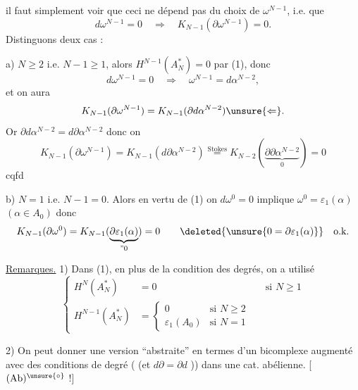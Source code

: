 
il faut simplement voir que ceci ne dépend pas du choix de $\omega^{N-1}$, i.e. que 
\[
d\omega^{N-1}=0\quad\Longrightarrow\quad
K_{N-1}(\partial\omega^{N-1})=0.
\]
Distinguons deux cas :

a) $N\geq2$ i.e. $N-1\geq1$, alors $H^{N-1}(A_N^*)=0$ par (1), donc
\[
d\omega^{N-1}=0\quad\Rightarrow\quad
\omega^{N-1}=d\alpha^{N-2},
\]
et on aura
\[
K_{N-1}(\partial\omega^{N-1})
=K_{N-1}(\partial d\alpha^{N-2})\unsure{\Leftarrow}.
\]
Or  $\partial d\alpha^{N-2}=d\partial\alpha^{N-2}$ donc on 
\[
K_{N-1}(\partial\omega^{N-1})
=K_{N-1}(d\partial\alpha^{N-2})
\overset{\text{Stokes}}{=}
K_{N-2}(\underbrace{\partial\partial\alpha^{N-2}}_{0})=0
\]
cqfd

b) $N=1$ i.e. $N-1=0$. Alors en vertu de (1) on
$d\omega^0=0$ implique $\omega^0=\varepsilon_1(\alpha)$
$(\alpha\in A_0)$ donc
\[
K_{N-1}(\partial\omega^0)
=K_{N-1}(\underbrace{\partial\varepsilon_1(\alpha)}_{\text{''}0})=0
\qquad\deleted{\unsure{0=\partial\varepsilon_1(\alpha)}}\quad\text{o.k.}
\]

\uline{Remarques.} 1) Dans  (1), en plus de la condition des degrés, on a utilisé
\[
\left\{
\begin{aligned}
H^N(A_N^*)&=0 &&\text{si }N\geq1\\
H^{N-1}(A_N^*)&=
\begin{cases}
0&\text{si }N\geq2\\
\varepsilon_1(A_0)&\text{si }N=1
\end{cases}
\end{aligned}
\right.
\]

2) On peut donner une version ``abstraite'' en termes d'un bicomplexe augmenté avec des conditions de degré ( (et $d\partial=\partial d$ \unsure{!}))  dans une cat. abélienne. [ $(\mathrm{Ab})^{\unsure{\circ}}$ !]


